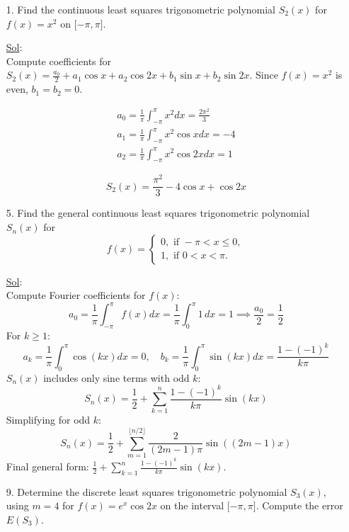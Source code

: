\begin{enumerate}
  \item[1.] Find the continuous least squares trigonometric
    polynomial \(S_2 (x)\) for \(f(x) = x^2\) on  \(\lbrack - \pi,
    \pi \rbrack\).

    \underline{Sol}:\\
    Compute coefficients for \( S_2(x) = \frac{a_0}{2} + a_1 \cos x +
    a_2 \cos 2x + b_1 \sin x + b_2 \sin 2x \). Since \( f(x) = x^2 \)
    is even, \( b_1 = b_2 = 0 \).

    \[
      \begin{array}{l}
        a_0 = \frac{1}{\pi} \int_{-\pi}^\pi x^2 dx = \frac{2\pi^2}{3} \\
        a_1 = \frac{1}{\pi} \int_{-\pi}^\pi x^2 \cos x dx = -4 \\
        a_2 = \frac{1}{\pi} \int_{-\pi}^\pi x^2 \cos 2x dx = 1
      \end{array}
    \]

    \[
      \boxed{S_2(x) = \frac{\pi^2}{3} - 4\cos x + \cos 2x}
    \]

  \item[5.] Find the general continuous least squares trigonometric
    polynomial \(S_n (x)\) for
    \[
      f(x) =
      \begin{cases}
        0, \textrm{ if } - \pi < x \leq 0, \\
        1, \textrm{ if } 0 < x < \pi.
      \end{cases}
    \]

    \underline{Sol}:\\
    Compute Fourier coefficients for \( f(x) \):
    \[
      a_0 = \frac{1}{\pi} \int_{-\pi}^\pi f(x)dx = \frac{1}{\pi}
      \int_0^\pi 1 \, dx = 1 \implies \frac{a_0}{2} = \frac{1}{2}
    \]
    For \( k \geq 1 \):
    \[
      a_k = \frac{1}{\pi} \int_0^\pi \cos(kx)dx = 0, \quad
      b_k = \frac{1}{\pi} \int_0^\pi \sin(kx)dx = \frac{1 - (-1)^k}{k\pi}
    \]
    \( S_n(x) \) includes only sine terms with odd \( k \):
    \[
      S_n(x) = \frac{1}{2} + \sum_{k=1}^n \frac{1 - (-1)^k}{k\pi} \sin(kx)
    \]
    Simplifying for odd \( k \):
    \[
      S_n(x) = \frac{1}{2} + \sum_{m=1}^{\lfloor n/2 \rfloor}
      \frac{2}{(2m-1)\pi} \sin((2m-1)x)
    \]
    Final general form: \(\boxed{\frac{1}{2} + \sum_{k=1}^{n} \frac{1
    - (-1)^k}{k\pi} \sin(kx)}\).

  \item[9.] Determine the discrete least squares trigonometric
    polynomial \(S_3 (x)\), using \(m = 4\) for \(f(x) = e^x \cos
    2x\) on the interval \(\lbrack - \pi, \pi \rbrack\). Compute the
    error \(E(S_3)\).


\end{enumerate}
